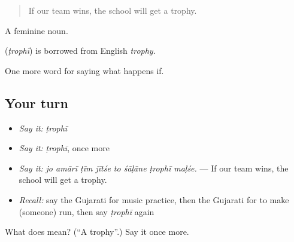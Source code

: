 \begin{quote}
If our team wins, the school will get a trophy.
\end{quote}

A feminine noun.

\begin{cousinweb}
\textbf{} (\emph{ṭrophī}) is borrowed from English \emph{trophy}.
\end{cousinweb}

\begin{grammarlens}[title={What you've built}]
One more word for saying what happens if.
\end{grammarlens}

\subsection*{Your turn}
\begin{itemize}
\raggedright
  \item \emph{Say it:} \emph{ṭrophī}
  \item \emph{Say it:} \emph{ṭrophī}, once more
  \item \emph{Say it:} \emph{jo amārī ṭīm jītśe to śāḷāne ṭrophī maḷśe.} — If our team wins, the school will get a trophy.
  \item \emph{Recall:} say the Gujarati for music practice, then the Gujarati for to make (someone) run, then say \emph{ṭrophī} again
\end{itemize}

\begin{tcolorbox}[breakable,colback=teal!4,colframe=teal!35!black,title={Before you move on}]
What does  mean? (\textquotedblleft{}A trophy\textquotedblright{}.) Say it once more.
\end{tcolorbox}
